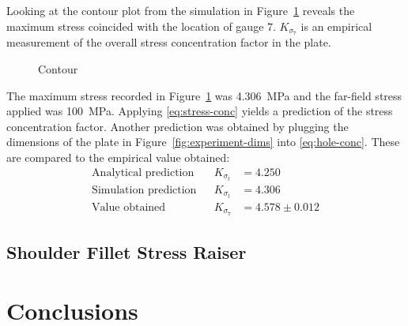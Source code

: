 \documentclass[a4paper,11pt,twocolumn]{article}
\newcommand{\MPa}{\si{\mega\pascal}\xspace}
\begin{document}
Looking at the contour plot from the simulation in 
Figure~\ref{fig:experiment-simulation} reveals the maximum stress coincided
with the location of gauge 7. $K_{\sigma_7}$ is an empirical
measurement of the overall stress concentration factor in the plate.

\begin{figure}[h]
    \centering
    \caption{Contour}
    \label{fig:experiment-simulation}
\end{figure}

The maximum stress recorded in Figure~\ref{fig:experiment-simulation} was
4.306~\MPa and the far-field stress applied was 100~\MPa. Applying 
\eqref{eq:stress-conc} yields a prediction of the stress concentration factor.
Another prediction was obtained by plugging the dimensions of the plate in
Figure~\ref{fig:experiment-dims} into \eqref{eq:hole-conc}. These are compared
to the empirical value obtained:
\begin{align*}
    \text{Analytical prediction} && K_{\sigma_t} &= 4.250 \\
    \text{Simulation prediction} && K_{\sigma_t} &= 4.306 \\
           \text{Value obtained} && K_{\sigma_7} &= 4.578\pm0.012
\end{align*}

\subsection{Shoulder Fillet Stress Raiser}

\section{Conclusions}

\printbibliography{}
\end{document}
